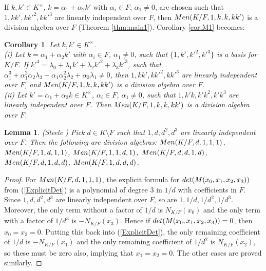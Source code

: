 \documentclass[11pt]{amsart}
\theoremstyle{plain}
\newtheorem{lemma}[theorem]{Lemma}
\newtheorem{corollary}[theorem]{Corollary}
\theoremstyle{definition}
\begin{document}
 If $k,k'\in K^\times$, $k=\alpha_1+\alpha_2k'$ with $\alpha_i\in F$, $\alpha_1\not=0$, are chosen such that $1,kk', kk'^2, kk'^3$  are linearly independent over $F$, then
${\rm Men}(K/F,1,k,k,kk')$ is a division algebra over $F$ (Theorem \ref{thm:main1}).
 Corollary \ref{cor:M1}  becomes:

\begin{corollary}
 Let $k,k'\in K^\times$.\\
(i) Let $k=\alpha_1+\alpha_2k'$ with $\alpha_i\in F$, $\alpha_1\not=0$, such that
 $\{1,k', k'^2, k'^3\}$ is a basis for $K/F$.
If $k'^4 = \lambda_0 + \lambda_1k' + \lambda_2k'^2 + \lambda_3k'^3$, such that
$\alpha_1^3 +\alpha_1^2\alpha_2 \lambda_3 - \alpha_1\alpha_2^2 \lambda_2 + \alpha_2 \lambda_1 \neq 0$, then $1, kk', kk'^2, kk'^3$ are linearly independent over $F$, and ${\rm Men}(K/F, 1,k,k,kk')$ is a division algebra over $F$.
\\ (ii) Let  $k'=\alpha_1+\alpha_2k\in K^\times$, $\alpha_i\in F$, $\alpha_1\not=0$, such that $1,k'k,k'k^2,k'k^{3}$ are linearly independent over $F$. Then ${\rm Men}(K/F,1,k,k,kk')$ is a division algebra  over $F$.
\end{corollary}


\begin{lemma}\label{4x4Ex1}(Steele \cite{ST})
Pick $d \in K\setminus F$ such that $1, d, d^2, d^3$ are linearly independent over $F$. Then the following are division algebras:
 ${\rm Men}(K/F, d,1,1,1)$,
 ${\rm Men}(K/F, 1,d,1,1)$,
 ${\rm Men}(K/F, 1,1,d,1)$,
 ${\rm Men}(K/F, d,d,1,d)$,
 ${\rm Men}(K/F, d,1,d,d)$, ${\rm Men}(K/F, 1,d,d,d)$.
\end{lemma}

\begin{proof}
   For ${\rm Men}(K/F, d,1,1,1)$, the explicit formula for ${\rm det}(M(x_0, x_1, x_2, x_3))$ from (\ref{ExplicitDet}) is a polynomial of degree 3 in $1/d$ with coefficients in $F$. Since $1, d, d^2, d^3$ are linearly independent over $F$, so are $1, 1/d, 1/d^2, 1/d^3$. Moreover, the only  term  without a factor of $1/d$ is $N_{K/F}(x_0)$ and the only term with a factor of $1/d^3$ is $-N_{K/F}(x_3)$. Hence if ${\rm det}(M(x_0, x_1, x_2, x_3)) = 0$, then $x_0 = x_3 = 0$. Putting this back into (\ref{ExplicitDet}),  the only remaining coefficient of $1/d$ is $-N_{K/F}(x_1)$ and the only remaining coefficient of $1/d^2$ is $N_{K/F}(x_2)$, so these must be zero also, implying that $x_1 = x_2 = 0$.
The other cases are proved similarly.
\end{proof}
\end{document}
